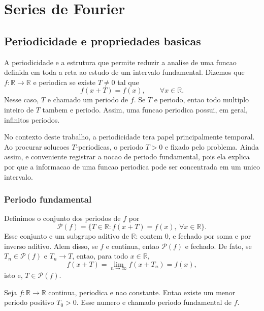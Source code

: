 \chapter{Series de Fourier}

\section{Periodicidade e propriedades basicas}

A periodicidade e a estrutura que permite reduzir a analise de uma funcao
definida em toda a reta ao estudo de um intervalo fundamental. Dizemos que
\(f:\mathbb{R}\to\mathbb{R}\) e periodica se existe \(T\neq 0\) tal que
\[
f(x+T)=f(x), \qquad \forall x\in\mathbb{R}.
\]
Nesse caso, \(T\) e chamado um periodo de \(f\). Se \(T\) e periodo, entao
todo multiplo inteiro de \(T\) tambem e periodo. Assim, uma funcao periodica
possui, em geral, infinitos periodos.

No contexto deste trabalho, a periodicidade tera papel principalmente temporal.
Ao procurar solucoes \(T\)-periodicas, o periodo \(T>0\) e fixado pelo problema.
Ainda assim, e conveniente registrar a nocao de periodo fundamental, pois ela
explica por que a informacao de uma funcao periodica pode ser concentrada em
um unico intervalo.

\subsection{Periodo fundamental}

Definimos o conjunto dos periodos de \(f\) por
\[
\mathcal{P}(f)=
\{T\in\mathbb{R}: f(x+T)=f(x),\ \forall x\in\mathbb{R}\}.
\]
Esse conjunto e um subgrupo aditivo de \(\mathbb{R}\): contem \(0\), e fechado
por soma e por inverso aditivo. Alem disso, se \(f\) e continua, entao
\(\mathcal{P}(f)\) e fechado. De fato, se \(T_n\in\mathcal{P}(f)\) e
\(T_n\to T\), entao, para todo \(x\in\mathbb{R}\),
\[
f(x+T)=\lim_{n\to\infty}f(x+T_n)=f(x),
\]
isto e, \(T\in\mathcal{P}(f)\).

\begin{proposicao}
Seja \(f:\mathbb{R}\to\mathbb{R}\) continua, periodica e nao constante. Entao
existe um menor periodo positivo \(T_0>0\). Esse numero e chamado periodo
fundamental de \(f\).
\end{proposicao}

